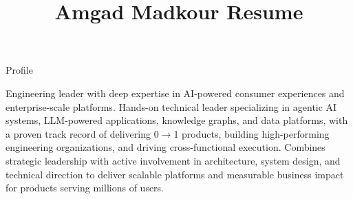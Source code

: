 \documentclass{resume}
\title{Amgad Madkour Resume}
\begin{document}

\begin{rSection}{Profile}

Engineering leader with deep expertise in AI-powered consumer experiences and enterprise-scale platforms. Hands-on technical leader specializing in agentic AI systems, LLM-powered applications, knowledge graphs, and data platforms, with a proven track record of delivering 0$\rightarrow$1 products, building high-performing engineering organizations, and driving cross-functional execution. Combines strategic leadership with active involvement in architecture, system design, and technical direction to deliver scalable platforms and measurable business impact for products serving millions of users.

\end{rSection}
\end{document}

